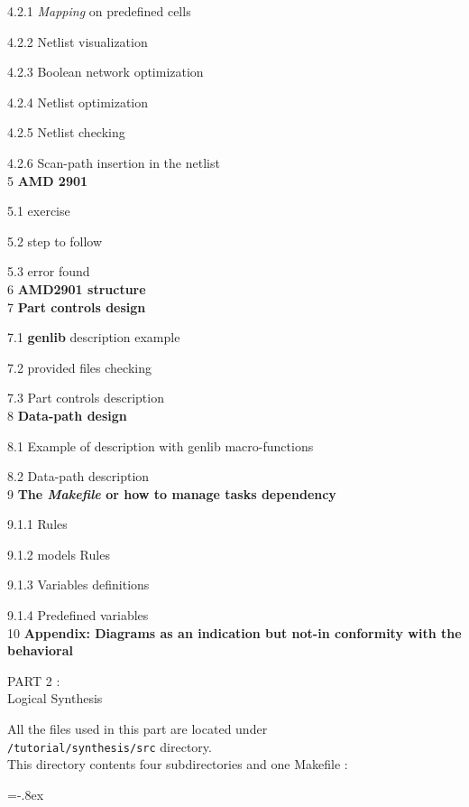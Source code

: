 \documentclass[12pt]{article}
\begin{document}
{\hspace{0.5cm} {4.2.1} {\it Mapping} on predefined cells

\hspace{0.5cm} {4.2.2} Netlist visualization

\hspace{0.5cm} {4.2.3} Boolean network optimization

\hspace{0.5cm} {4.2.4} Netlist optimization 

\hspace{0.5cm} {4.2.5} Netlist checking

\hspace{0.5cm} {4.2.6} Scan-path insertion in the netlist
\\
 {5} {\bf AMD 2901}

 {5.1} exercise

 {5.2} step to follow

 {5.3} error found
\\
 {6} {\bf AMD2901 structure}
\\
 {7} {\bf Part controls design }

 {7.1}{ \bf genlib } description example 

 {7.2} provided files checking

 {7.3} Part controls description
\\
 {8} {\bf Data-path design}

 {8.1} Example of description with genlib macro-functions

 {8.2} Data-path description
\\
{9} {\bf The { \it Makefile } or how to manage tasks dependency }

 {9.1.1} Rules

 {9.1.2} models Rules

 {9.1.3} Variables definitions 

 {9.1.4} Predefined variables
\\
 {10} {\bf Appendix: Diagrams as an indication but not-in conformity with the behavioral}


\newpage
       {\huge
        PART 2 :\\ }
        \vspace{1cm}
        {\huge
        Logical Synthesis
        }

All the files used in this part are located under \\
\texttt{/tutorial/synthesis/src} directory.\\
This directory contents four subdirectories and one Makefile :
\begin{itemize}\itemsep=-.8ex


\end{itemize}}
\end{document}
